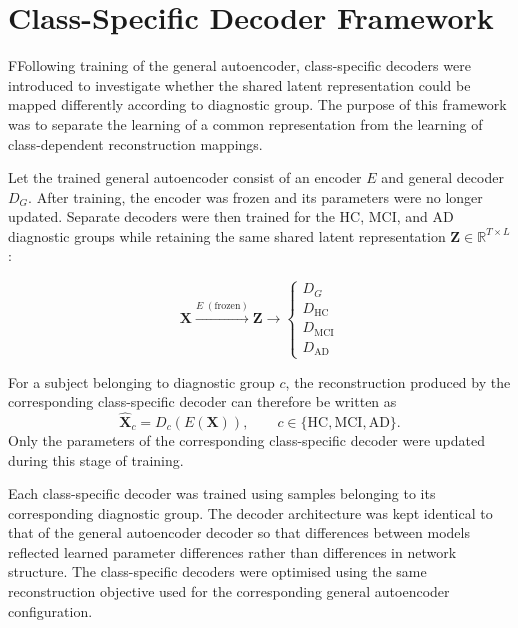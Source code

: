 \section{Class-Specific Decoder Framework}

FFollowing training of the general autoencoder, class-specific decoders were
introduced to investigate whether the shared latent representation could be
mapped differently according to diagnostic group. The purpose of this
framework was to separate the learning of a common representation from the
learning of class-dependent reconstruction mappings.

Let the trained general autoencoder consist of an encoder $E$ and general
decoder $D_G$. After training, the encoder was frozen and its parameters
were no longer updated. Separate decoders were then trained for the HC,
MCI, and AD diagnostic groups while retaining the same shared latent
representation $\mathbf{Z}\in\mathbb{R}^{T\times L}$:

\begin{equation}
    \mathbf{X}
    \xrightarrow{E\;(\mathrm{frozen})}
    \mathbf{Z}
    \longrightarrow
    \left\{
    \begin{array}{l}
        D_G \\
        D_{\mathrm{HC}} \\
        D_{\mathrm{MCI}} \\
        D_{\mathrm{AD}}
    \end{array}
    \right.
\end{equation}

For a subject belonging to diagnostic group $c$, the reconstruction
produced by the corresponding class-specific decoder can therefore be
written as
\begin{equation}
    \hat{\mathbf{X}}_c
    =
    D_c\left(E(\mathbf{X})\right),
    \qquad
    c\in\{\mathrm{HC},\mathrm{MCI},\mathrm{AD}\}.
\end{equation}
Only the parameters of the corresponding class-specific decoder were
updated during this stage of training.

Each class-specific decoder was trained using samples belonging to its
corresponding diagnostic group. The decoder architecture was kept identical
to that of the general autoencoder decoder so that differences between
models reflected learned parameter differences rather than differences in
network structure. The class-specific decoders were optimised using the
same reconstruction objective used for the corresponding general
autoencoder configuration.

